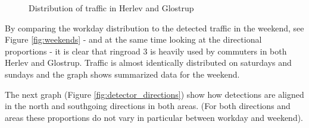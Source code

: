 \begin{figure}[htbp]
\centering
{}

\caption{Distribution of traffic in Herlev and Glostrup}
\end{figure}

By comparing the workday distribution to the detected traffic in the weekend, see Figure \ref{fig:weekends} - and at the same time looking at the directional proportions - it is clear that ringroad 3 is heavily used by commuters in both Herlev and Glostrup. Traffic is almost identically distributed on saturdays and sundays and the graph shows summarized data for the weekend.


The next graph (Figure \ref{fig:detector_directions}) show how detections are aligned in the north and southgoing directions in both areas. (For both directions and areas these proportions do not vary in particular between workday and weekend).

